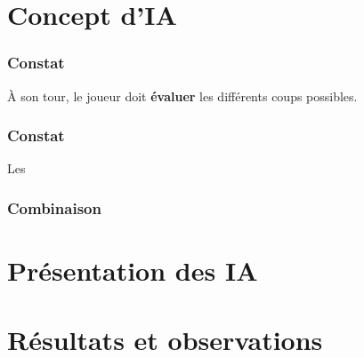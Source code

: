 \documentclass{beamer}
\begin{document}
\section{Concept d'IA}

\begin{frame}
    \frametitle{Constat}

    \begin{large}
        À son tour, le joueur doit \textbf{évaluer} les différents coups possibles.
    \end{large}

\end{frame}

\begin{frame}
    \frametitle{Constat}

    \huge Les

\end{frame}

\begin{frame}
    \frametitle{Combinaison}
\end{frame}

\section{Présentation des IA}

\section{Résultats et observations}
\end{document}
